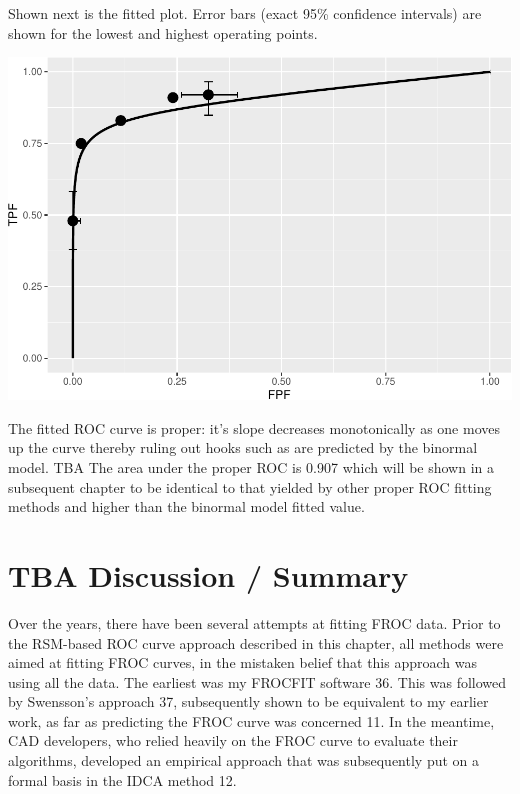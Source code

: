 \documentclass[
]{book}
\begin{document}
Shown next is the fitted plot. Error bars (exact 95\% confidence intervals) are shown for the lowest and highest operating points.

\includegraphics{09-rsm-fitting_files/figure-latex/unnamed-chunk-2-1.pdf}

The fitted ROC curve is proper: it's slope decreases monotonically as one moves up the curve thereby ruling out hooks such as are predicted by the binormal model. TBA The area under the proper ROC is 0.907 which will be shown in a subsequent chapter to be identical to that yielded by other proper ROC fitting methods and higher than the binormal model fitted value.

\hypertarget{rsm-fitting-discussion-summary}{%
\section{TBA Discussion / Summary}\label{rsm-fitting-discussion-summary}}

Over the years, there have been several attempts at fitting FROC data. Prior to the RSM-based ROC curve approach described in this chapter, all methods were aimed at fitting FROC curves, in the mistaken belief that this approach was using all the data. The earliest was my FROCFIT software 36. This was followed by Swensson's approach 37, subsequently shown to be equivalent to my earlier work, as far as predicting the FROC curve was concerned 11. In the meantime, CAD developers, who relied heavily on the FROC curve to evaluate their algorithms, developed an empirical approach that was subsequently put on a formal basis in the IDCA method 12.
\end{document}
